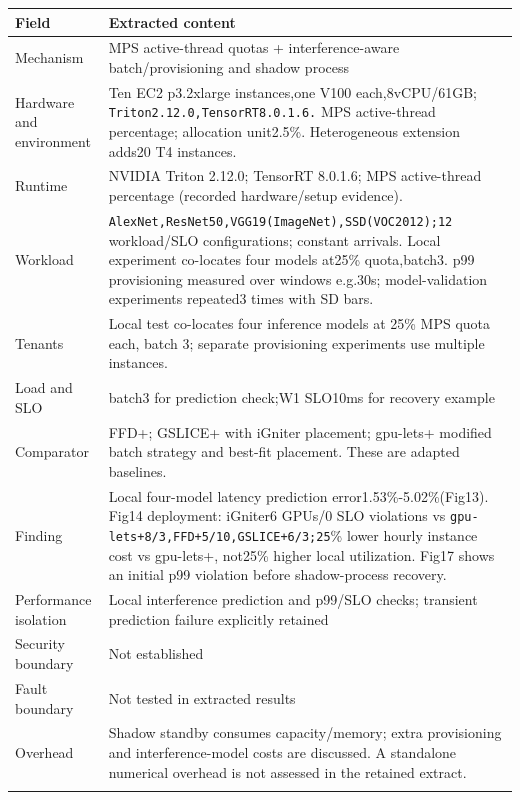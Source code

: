 \begin{longtable}{>{\raggedright\arraybackslash}p{}>{\raggedright\arraybackslash}p{}}
\toprule
\textbf{Field} & \textbf{Extracted content}\\\midrule\endhead
Mechanism & MPS active-thread quotas + interference-aware batch/provisioning and shadow process\\\addlinespace
Hardware and environment & Ten EC2 p3.2xlarge instances,one V100 each,8vCPU/61GB; \nolinkurl{Triton2.12.0,TensorRT8.0.1.6.} MPS active-thread percentage; allocation unit2.5\%. Heterogeneous extension adds20 T4 instances.\\\addlinespace
Runtime & NVIDIA Triton 2.12.0; TensorRT 8.0.1.6; MPS active-thread percentage (recorded hardware/setup evidence).\\\addlinespace
Workload & \nolinkurl{AlexNet,ResNet50,VGG19(ImageNet),SSD(VOC2012);12} workload/SLO configurations; constant arrivals. Local experiment co-locates four models at25\% quota,batch3. p99 provisioning measured over windows e.g.30s; model-validation experiments repeated3 times with SD bars.\\\addlinespace
Tenants & Local test co-locates four inference models at 25\% MPS quota each, batch 3; separate provisioning experiments use multiple instances.\\\addlinespace
Load and SLO & batch3 for prediction check;W1 SLO10ms for recovery example\\\addlinespace
Comparator & FFD+; GSLICE+ with iGniter placement; gpu-lets+ modified batch strategy and best-fit placement. These are adapted baselines.\\\addlinespace
Finding & Local four-model latency prediction error1.53\%-5.02\%(Fig13). Fig14 deployment: iGniter6 GPUs/0 SLO violations vs \nolinkurl{gpu-lets+8/3,FFD+5/10,GSLICE+6/3;25}\% lower hourly instance cost vs gpu-lets+, not25\% higher local utilization. Fig17 shows an initial p99 violation before shadow-process recovery.\\\addlinespace
Performance isolation & Local interference prediction and p99/SLO checks; transient prediction failure explicitly retained\\\addlinespace
Security boundary & Not established\\\addlinespace
Fault boundary & Not tested in extracted results\\\addlinespace
Overhead & Shadow standby consumes capacity/memory; extra provisioning and interference-model costs are discussed. A standalone numerical overhead is not assessed in the retained extract.\\\addlinespace

\end{longtable}
